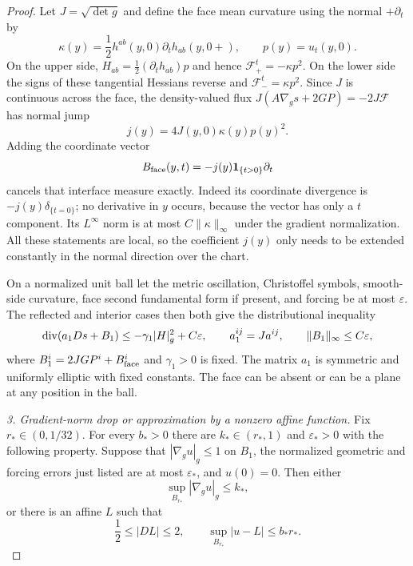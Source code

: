 \begin{proof}
Let $J=\sqrt{\det g}$ and define the face mean curvature using the normal
$+\partial_t$ by
\[
 \kappa(y)=\frac12 h^{ab}(y,0)\partial_t h_{ab}(y,0+),
 \qquad p(y)=u_t(y,0).
\]
On the upper side, $H_{ab}=\tfrac12(\partial_t h_{ab})p$ and hence
$\mathcal F^t_+=-\kappa p^2$.  On the lower side the signs of these
tangential Hessians reverse and $\mathcal F^t_- =\kappa p^2$.
Since $J$ is continuous across the face, the density-valued flux
$J(A\nabla_gs+2GP)=-2J\mathcal F$ has normal jump
\[
 j(y)=4J(y,0)\kappa(y)p(y)^2.
\]
Adding the coordinate vector
\begin{equation}
 B_{\rm face}(y,t)=-j(y)\mathbf1_{\{t>0\}}\partial_t
 \label{eq:elliptic:face-step}
\end{equation}
cancels that interface measure exactly.  Indeed its coordinate
divergence is $-j(y)\delta_{\{t=0\}}$; no derivative in $y$ occurs,
because the vector has only a $t$ component.  Its $L^\infty$ norm is
at most $C\|\kappa\|_\infty$ under the gradient normalization.
All these statements are local, so the coefficient $j(y)$ only needs
to be extended constantly in the normal direction over the chart.

On a normalized unit ball let the metric oscillation, Christoffel symbols,
smooth-side curvature, face second fundamental form if present, and
forcing be at most $\varepsilon$.  The reflected and interior cases
then both give the distributional inequality
\begin{equation}
 \operatorname{div}(a_1Ds+B_1)
       \leq-\gamma_1|H|_g^2+C\varepsilon,
 \qquad
 a_1^{ij}=Ja^{ij},\qquad
 \|B_1\|_\infty\leq C\varepsilon,
 \label{eq:elliptic:deficit-coordinate}
\end{equation}
where $B_1^i=2JG P^i+B_{\rm face}^i$ and $\gamma_1>0$ is fixed.
The matrix $a_1$ is symmetric and uniformly elliptic with fixed constants.
The face can be absent or can be a plane at any position in the ball.

\medskip\noindent
\emph{3. Gradient-norm drop or approximation by a nonzero affine function.}
Fix $r_*\in(0,1/32)$.  For every $b_*>0$ there are
$k_*\in(r_*,1)$ and $\varepsilon_*>0$ with the following property.
Suppose that $|\nabla_g u|_g\leq1$ on $B_1$, the normalized geometric
and forcing errors just listed are at most $\varepsilon_*$, and
$u(0)=0$.  Then either
\begin{equation}
 \sup_{B_{r_*}}|\nabla_g u|_g\leq k_*,
 \label{eq:elliptic:norm-drop}
\end{equation}
or there is an affine $L$ such that
\begin{equation}
 \frac12\leq|DL|\leq2,\qquad
 \sup_{B_{r_*}}|u-L|\leq b_*r_*.
 \label{eq:elliptic:affine-entry}
\end{equation}


\end{proof}
